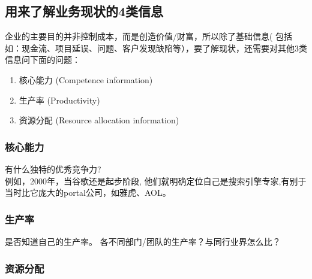 \hypertarget{ux7528ux6765ux4e86ux89e3ux4e1aux52a1ux73b0ux72b6ux76844ux7c7bux4fe1ux606f}{%
\subsection{用来了解业务现状的4类信息}\label{ux7528ux6765ux4e86ux89e3ux4e1aux52a1ux73b0ux72b6ux76844ux7c7bux4fe1ux606f}}

企业的主要目的并非控制成本，而是创造价值/财富，所以除了基础信息(
包括如：现金流、项目延误、问题、客户发现缺陷等），要了解现状，还需要对其他3类信息问下面的问题：

\begin{enumerate}
\tightlist
\item
  核心能力 (Competence information)
\item
  生产率 (Productivity)
\item
  资源分配 (Resource allocation information)
\end{enumerate}

\hypertarget{ux6838ux5fc3ux80fdux529b}{%
\subsubsection{核心能力}\label{ux6838ux5fc3ux80fdux529b}}

有什么独特的优秀竞争力?\\
例如，2000年，当谷歌还是起步阶段,
他们就明确定位自己是搜索引擎专家,有别于当时比它庞大的portal公司，如雅虎、AOL。

\hypertarget{ux751fux4ea7ux7387}{%
\subsubsection{生产率}\label{ux751fux4ea7ux7387}}

是否知道自己的生产率。 各不同部门/团队的生产率？与同行业界怎么比？


\hypertarget{ux8d44ux6e90ux5206ux914d}{%
\subsubsection{资源分配}\label{ux8d44ux6e90ux5206ux914d}}

